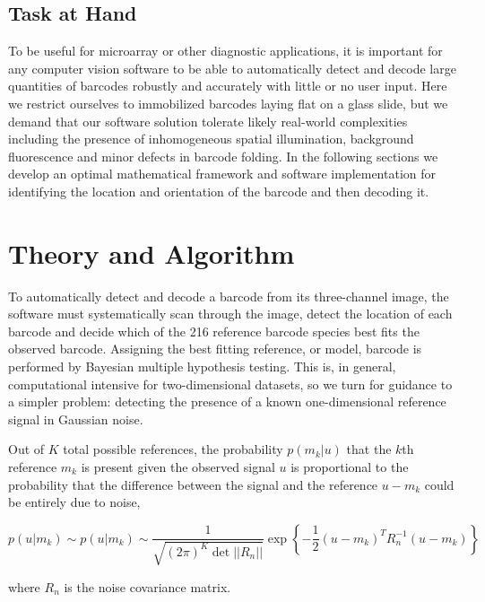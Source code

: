 \subsection{Task at Hand}
To be useful for microarray or other diagnostic applications, it is important for any computer vision software to be able to automatically detect and decode large quantities of barcodes robustly and accurately with little or no user input. 
Here we restrict ourselves to immobilized barcodes laying flat on a glass slide, but we demand that our software solution tolerate  likely real-world complexities including the presence of inhomogeneous spatial illumination, background fluorescence and minor defects in barcode folding.  
In the following sections we develop an optimal mathematical framework and software implementation for identifying the location and orientation of the barcode and then decoding it.


\section{Theory and Algorithm}
To automatically detect and decode a barcode from its three-channel image, the software must systematically scan through the image, detect the location of each barcode and decide which of the 216 reference barcode species best fits the observed barcode. Assigning the best fitting reference, or model, barcode is performed by Bayesian multiple hypothesis testing. This is, in general, computational intensive for two-dimensional datasets, so we turn for guidance to a simpler problem: detecting the presence of a known one-dimensional reference signal in Gaussian noise.


Out of $K$ total possible references, the probability $p(m_k|u)$ that the $k$th reference $m_k$ is present given the  observed signal $u$ is proportional to the probability that the difference between the signal and the reference $u-m_k$ could be entirely due to noise,


\begin{equation}
p(u|m_k)\sim p(u|m_k) \sim \frac{1}{  \sqrt{ (2\pi)^K \det || R_n||} } \exp\left\{ -\frac{1}{2}  (u-m_k)^T R_n^{-1} (u-m_k) \right\}
\end{equation}

where $R_n$ is the noise covariance matrix. 






